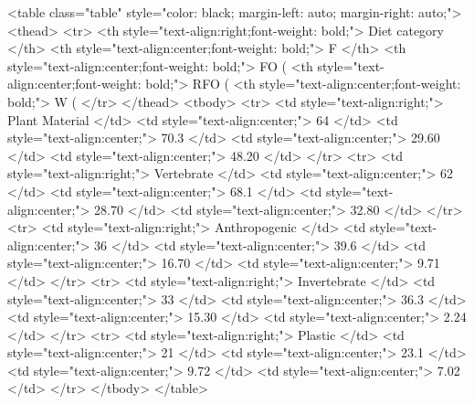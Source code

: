 <table class="table" style="color: black; margin-left: auto; margin-right: auto;">
 <thead>
  <tr>
   <th style="text-align:right;font-weight: bold;"> Diet category </th>
   <th style="text-align:center;font-weight: bold;"> F </th>
   <th style="text-align:center;font-weight: bold;"> FO (%
   <th style="text-align:center;font-weight: bold;"> RFO (%
   <th style="text-align:center;font-weight: bold;"> W (%
  </tr>
 </thead>
<tbody>
  <tr>
   <td style="text-align:right;"> Plant Material </td>
   <td style="text-align:center;"> 64 </td>
   <td style="text-align:center;"> 70.3 </td>
   <td style="text-align:center;"> 29.60 </td>
   <td style="text-align:center;"> 48.20 </td>
  </tr>
  <tr>
   <td style="text-align:right;"> Vertebrate </td>
   <td style="text-align:center;"> 62 </td>
   <td style="text-align:center;"> 68.1 </td>
   <td style="text-align:center;"> 28.70 </td>
   <td style="text-align:center;"> 32.80 </td>
  </tr>
  <tr>
   <td style="text-align:right;"> Anthropogenic </td>
   <td style="text-align:center;"> 36 </td>
   <td style="text-align:center;"> 39.6 </td>
   <td style="text-align:center;"> 16.70 </td>
   <td style="text-align:center;"> 9.71 </td>
  </tr>
  <tr>
   <td style="text-align:right;"> Invertebrate </td>
   <td style="text-align:center;"> 33 </td>
   <td style="text-align:center;"> 36.3 </td>
   <td style="text-align:center;"> 15.30 </td>
   <td style="text-align:center;"> 2.24 </td>
  </tr>
  <tr>
   <td style="text-align:right;"> Plastic </td>
   <td style="text-align:center;"> 21 </td>
   <td style="text-align:center;"> 23.1 </td>
   <td style="text-align:center;"> 9.72 </td>
   <td style="text-align:center;"> 7.02 </td>
  </tr>
</tbody>
</table>
